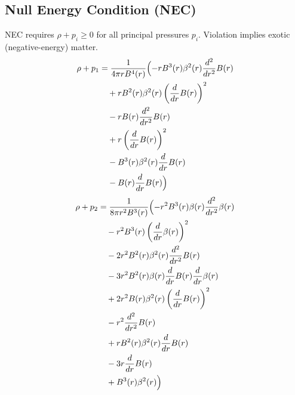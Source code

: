 \documentclass[11pt,a4paper]{article}
\begin{document}
\subsection{Null Energy Condition (NEC)}
NEC requires $\rho + p_i \geq 0$ for all principal pressures $p_i$. Violation implies exotic (negative-energy) matter.
\begin{align*}
  \rho + p_1 &= \frac{1}{4 \pi r B^{4}{\left(r \right)}}\Bigl(- r B^{3}{\left(r \right)} \beta^{2}{\left(r \right)} \frac{d^{2}}{d r^{2}} B{\left(r \right)} \\
  &\quad + r B^{2}{\left(r \right)} \beta^{2}{\left(r \right)} \left(\frac{d}{d r} B{\left(r \right)}\right)^{2} \\
  &\quad - r B{\left(r \right)} \frac{d^{2}}{d r^{2}} B{\left(r \right)} \\
  &\quad + r \left(\frac{d}{d r} B{\left(r \right)}\right)^{2} \\
  &\quad - B^{3}{\left(r \right)} \beta^{2}{\left(r \right)} \frac{d}{d r} B{\left(r \right)} \\
  &\quad - B{\left(r \right)} \frac{d}{d r} B{\left(r \right)}\Bigr)
\end{align*}
\begin{align*}
  \rho + p_2 &= \frac{1}{8 \pi r^{2} B^{3}{\left(r \right)}}\Bigl(- r^{2} B^{3}{\left(r \right)} \beta{\left(r \right)} \frac{d^{2}}{d r^{2}} \beta{\left(r \right)} \\
  &\quad - r^{2} B^{3}{\left(r \right)} \left(\frac{d}{d r} \beta{\left(r \right)}\right)^{2} \\
  &\quad - 2 r^{2} B^{2}{\left(r \right)} \beta^{2}{\left(r \right)} \frac{d^{2}}{d r^{2}} B{\left(r \right)} \\
  &\quad - 3 r^{2} B^{2}{\left(r \right)} \beta{\left(r \right)} \frac{d}{d r} B{\left(r \right)} \frac{d}{d r} \beta{\left(r \right)} \\
  &\quad + 2 r^{2} B{\left(r \right)} \beta^{2}{\left(r \right)} \left(\frac{d}{d r} B{\left(r \right)}\right)^{2} \\
  &\quad - r^{2} \frac{d^{2}}{d r^{2}} B{\left(r \right)} \\
  &\quad + r B^{2}{\left(r \right)} \beta^{2}{\left(r \right)} \frac{d}{d r} B{\left(r \right)} \\
  &\quad - 3 r \frac{d}{d r} B{\left(r \right)} \\
  &\quad + B^{3}{\left(r \right)} \beta^{2}{\left(r \right)}\Bigr)
\end{align*}
\end{document}
